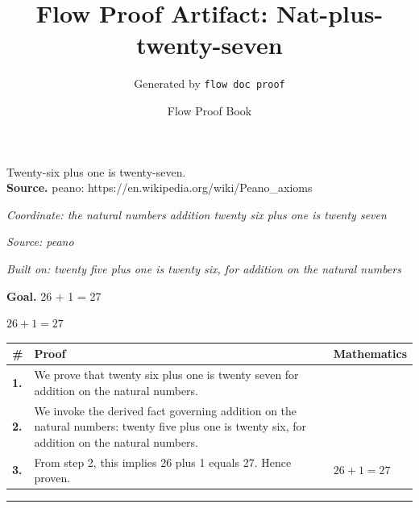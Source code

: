 \documentclass[11pt]{article}
\title{Flow Proof Artifact: Nat-plus-twenty-seven}
\author{Generated by \texttt{flow doc proof}}
\date{Flow Proof Book}
\theoremstyle{definition}
\begin{document}
\maketitle
Twenty-six plus one is twenty-seven.\\[0.5em]
\textbf{Source.} peano: https://en.wikipedia.org/wiki/Peano\_axioms\\[0.5em]
\bigskip
{}\par
\smallskip\noindent\textit{Coordinate: the natural numbers \cdot addition \cdot twenty six plus one is twenty seven}\par
\smallskip\noindent\textit{Source: peano}\par
\smallskip\noindent\textit{Built on: twenty five plus one is twenty six, for addition on the natural numbers}\par
\medskip
\noindent\textbf{Goal.} 26 + 1 = 27\par
\noindent$\displaystyle 26 + 1 = 27$\par
\medskip
\noindent
\begin{tabular}{@{} >{\raggedright\arraybackslash}p{} >{\raggedright\arraybackslash}p{} >{\raggedleft\arraybackslash}p{} @{}}
\textbf{\#} & \textbf{Proof} & \textbf{Mathematics} \\
\midrule
\textbf{1.} & We prove that twenty six plus one is twenty seven for addition on the natural numbers. & \\[0.45em]
\textbf{2.} & We invoke the derived fact governing addition on the natural numbers: twenty five plus one is twenty six, for addition on the natural numbers. & \\[0.45em]
\textbf{3.} & From step 2, this implies 26 plus 1 equals 27. Hence proven. & $\displaystyle 26 + 1 = 27$ \\[0.45em]
\bottomrule
\end{tabular}
\label{thm:Nat-addition-twenty_six_plus_one_is_twenty_seven}
\par\medskip\hrule
\end{document}

